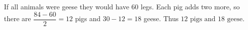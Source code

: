 If all animals were geese they would have 60 legs. Each pig adds two more, so there are $\dfrac{84-60}{2}=12$ pigs and $30-12=18$ geese. Thus $\boxed{12\text{ pigs and }18\text{ geese}}$.
